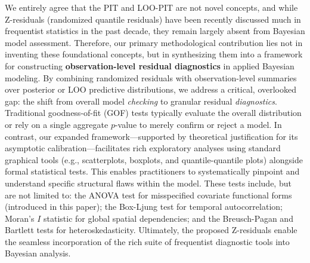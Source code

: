 \documentclass[11pt]{article}
\begin{document}
We entirely agree that the PIT and LOO-PIT are not novel concepts, and while Z-residuals (randomized quantile residuals) have been recently discussed much in frequentist statistics in the past decade, they remain largely absent from Bayesian model assessment. Therefore, our primary methodological contribution lies not in inventing these foundational concepts, but in synthesizing them into a framework for constructing \textbf{observation-level residual diagnostics} in applied Bayesian modeling. By combining randomized residuals with observation-level summaries over posterior or LOO predictive distributions, we address a critical, overlooked gap: the shift from overall model \textit{checking} to granular residual \textit{diagnostics}. Traditional goodness-of-fit (GOF) tests typically evaluate the overall distribution or rely on a single aggregate $p$-value to merely confirm or reject a model. In contrast, our expanded framework---supported by theoretical justification for its asymptotic calibration---facilitates rich exploratory analyses using standard graphical tools (e.g., scatterplots, boxplots, and quantile-quantile plots) alongside formal statistical tests. This enables practitioners to systematically pinpoint and understand specific structural flaws within the model. These tests include, but are not limited to: the ANOVA test for misspecified covariate functional forms (introduced in this paper); the Box-Ljung test for temporal autocorrelation; Moran's $I$ statistic for global spatial dependencies; and the Breusch-Pagan and Bartlett tests for heteroskedasticity. Ultimately, the proposed Z-residuals enable the seamless incorporation of the rich suite of frequentist diagnostic tools into Bayesian analysis.
\end{document}
